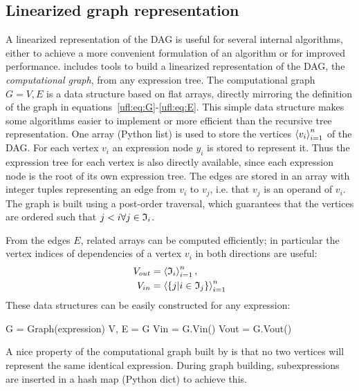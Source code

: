 \subsection{Linearized graph representation} \label{ufl:sec:graphs}
 A linearized representation of the DAG is
useful for several internal algorithms, either to achieve a more
convenient formulation of an algorithm or for improved performance.
\ufl{} includes tools to build a linearized representation of the DAG,
the \emph{computational graph}, from any expression tree.  The
computational graph $G = V, E$ is a data structure based on flat
arrays, directly mirroring the definition of the graph in
equations~\eqref{ufl:eq:G}-\eqref{ufl:eq:E}.  This simple data
structure makes some algorithms easier to implement or more efficient
than the recursive tree representation.  One array (Python list)
 is used to store the vertices $\left\langle{v_i}\right\rangle_{i=1}^n$ of the
DAG.  For each vertex $v_i$ an expression node $y_i$ is stored to
represent it.  Thus the expression tree for each vertex is also
directly available, since each expression node is the root of its own
expression tree. The edges are stored in an array  with
integer tuples  representing an edge from $v_i$ to $v_j$,
i.e. that $v_j$ is an operand of $v_i$.  The graph is built using a
post-order traversal, which guarantees that the vertices are ordered
such that $j < i \forall j \in \mathfrak{I}_i$.

From the edges $E$, related arrays can be computed efficiently; in
particular the vertex indices of dependencies of a vertex $v_i$ in
both directions are useful: %
\begin{align}
\begin{split}
V_{out} &= \left\langle{\mathfrak{I}_i}\right\rangle_{i=1}^{n}, \\
V_{in}  &= \left\langle{\{ j | i \in \mathfrak{I}_j \}}\right\rangle_{i=1}^{n}
\end{split}
\end{align}
These data structures can be easily constructed for any expression:
\begin{python}
G = Graph(expression)
V, E = G
Vin = G.Vin()
Vout = G.Vout()
\end{python}
A nice property of the computational graph built by \ufl{} is that no
two vertices will represent the same identical expression.  During
graph building, subexpressions are inserted in a hash map (Python
dict) to achieve this.

